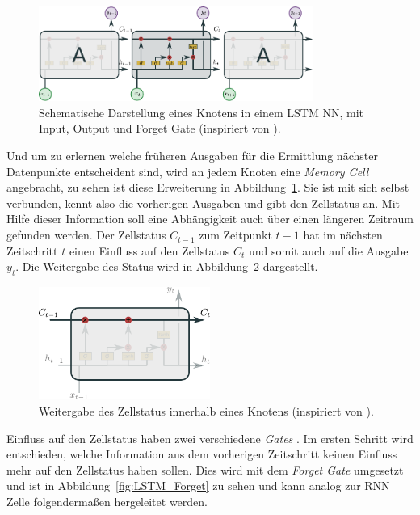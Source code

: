             \begin{figure}[h]
                \centering
                \includegraphics[width=0.8\textwidth]{images/Illustrationen/LSTM}
                \caption{Schematische Darstellung eines Knotens in einem LSTM NN, mit Input, Output und Forget Gate (inspiriert von \cite{OLAH2015}).}
                \label{fig:LSTM}
            \end{figure}

            Und um zu erlernen welche früheren Ausgaben für die Ermittlung nächster Datenpunkte entscheident sind, wird an jedem Knoten eine \textit{Memory Cell}  angebracht, zu sehen ist diese Erweiterung in Abbildung~\ref{fig:LSTM}.
            Sie ist mit sich selbst verbunden, kennt also die vorherigen Ausgaben und gibt den Zellstatus an.
            Mit Hilfe dieser Information soll eine Abhängigkeit auch über einen längeren Zeitraum gefunden werden.
            Der Zellstatus $C_{t-1}$ zum Zeitpunkt $t-1$ hat im nächsten Zeitschritt $t$ einen Einfluss auf den Zellstatus $C_{t}$ und somit auch auf die Ausgabe $y_t$.
            Die Weitergabe des Status wird in Abbildung~\ref{fig:LSTM_Status} dargestellt.

                \begin{figure}[h]
                    \centering
                    \includegraphics[width=0.5\textwidth]{images/Illustrationen/LSTM_MC}
                    \caption{Weitergabe des Zellstatus innerhalb eines Knotens (inspiriert von \cite{OLAH2015}).}
                    \label{fig:LSTM_Status}
                \end{figure}
                
                Einfluss auf den Zellstatus haben zwei verschiedene \textit{Gates} .
            Im ersten Schritt wird entschieden, welche Information aus dem vorherigen Zeitschritt keinen Einfluss mehr auf den Zellstatus haben sollen.
            Dies wird mit dem \textit{Forget Gate} umgesetzt und ist in Abbildung~\ref{fig:LSTM_Forget} zu sehen und kann analog zur RNN Zelle folgendermaßen hergeleitet werden.

